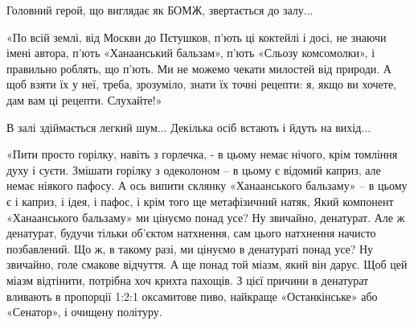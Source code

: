 \begin{multicols}{2} %
\setlength{\parindent}{0pt}





\end{multicols} %

Головний герой, що виглядає як БОМЖ, звертається до залу...

«По всій землі, від Москви до Пєтушков, п'ють ці коктейлі і досі, не знаючи
імені автора, п'ють «Ханаанський бальзам», п'ють «Сльозу комсомолки», і
правильно роблять, що п'ють. Ми не можемо чекати милостей від природи. А щоб
взяти їх у неї, треба, зрозуміло, знати їх точні рецепти: я, якщо ви хочете,
дам вам ці рецепти. Слухайте!»

В залі здіймається легкий шум... Декілька осіб встають і йдуть на вихід...

«Пити просто горілку, навіть з горлечка, - в цьому немає нічого, крім томління
духу і суєти. Змішати горілку з одеколоном – в цьому є відомий каприз, але
немає ніякого пафосу. А ось випити склянку «Ханаанського бальзаму» – в цьому є
і каприз, і ідея, і пафос, і крім того ще метафізичний натяк,
Який компонент «Ханаанського бальзаму» ми цінуємо понад усе? Ну звичайно,
денатурат. Але ж денатурат, будучи тільки об'єктом натхнення, сам цього
натхнення начисто позбавлений. Що ж, в такому разі, ми цінуємо в денатураті
понад усе? Ну звичайно, голе смакове відчуття. А ще понад той міазм, який він
дарує. Щоб цей міазм відтінити, потрібна хоч крихта пахощів. З цієї причини в
денатурат вливають в пропорції 1:2:1 оксамитове пиво, найкраще «Останкінське»
або «Сенатор», і очищену політуру.

